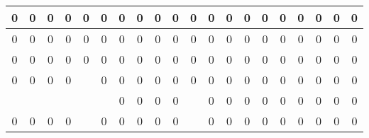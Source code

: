 \documentclass[a4paper]{article}
\begin{document}
{\begin{tabular}{|c|c|c|c|c|c|c|c|c|c|c|c|c|c|c|c|c|c|c|c|}
\cellcolor{black}0 & \cellcolor{black}0 & \cellcolor{black}0 & \cellcolor{black}0 & \cellcolor{black}0 & \cellcolor{black}0 & \cellcolor{black}0 & \cellcolor{black}0 & \cellcolor{black}0 & \cellcolor{black}0 & \cellcolor{black}0 & \cellcolor{black}0 & \cellcolor{black}0 & \cellcolor{black}0 & \cellcolor{black}0 & \cellcolor{black}0 & \cellcolor{black}0 & \cellcolor{black}0 & \cellcolor{black}0 & \cellcolor{black}0\\ \hline
\cellcolor{black}0 & \cellcolor{black}0 & \cellcolor{black}0 & \cellcolor{black}0 & \cellcolor{black}0 & \cellcolor{black}0 & \cellcolor{black}0 & \cellcolor{black}0 & \cellcolor{black}0 & \cellcolor{black}0 & \cellcolor{black}0 & \cellcolor{black}0 & \cellcolor{black}0 & \cellcolor{black}0 & \cellcolor{black}0 & \cellcolor{black}0 & \cellcolor{black}0 & \cellcolor{black}0 & \cellcolor{black}0 & \cellcolor{black}0\\ \hline
\cellcolor{black}0 & \cellcolor{black}0 & \cellcolor{black}0 & \cellcolor{black}0 & \cellcolor{black}0 & \cellcolor{black}0 & \cellcolor{black}0 & \cellcolor{black}0 & \cellcolor{black}0 & \cellcolor{black}0 & \cellcolor{black}0 & \cellcolor{black}0 & \cellcolor{black}0 & \cellcolor{black}0 & \cellcolor{black}0 & \cellcolor{black}0 & \cellcolor{black}0 & \cellcolor{black}0 & \cellcolor{black}0 & \cellcolor{black}0\\ \hline
\cellcolor{black}0 & \cellcolor{black}0 & \cellcolor{black}0 & \cellcolor{black}0 &  & \cellcolor{black}0 & \cellcolor{black}0 & \cellcolor{black}0 & \cellcolor{black}0 & \cellcolor{black}0 & \cellcolor{black}0 & \cellcolor{black}0 & \cellcolor{black}0 & \cellcolor{black}0 & \cellcolor{black}0 & \cellcolor{black}0 & \cellcolor{black}0 & \cellcolor{black}0 & \cellcolor{black}0 & \cellcolor{black}0\\ \hline
 &  &  &  &  &  & \cellcolor{black}0 & \cellcolor{black}0 & \cellcolor{black}0 & \cellcolor{black}0 &  & \cellcolor{black}0 & \cellcolor{black}0 & \cellcolor{black}0 & \cellcolor{black}0 & \cellcolor{black}0 & \cellcolor{black}0 & \cellcolor{black}0 & \cellcolor{black}0 & \cellcolor{black}0\\ \hline
\cellcolor{black}0 & \cellcolor{black}0 & \cellcolor{black}0 & \cellcolor{black}0 &  & \cellcolor{black}0 & \cellcolor{black}0 & \cellcolor{black}0 & \cellcolor{black}0 & \cellcolor{black}0 &  & \cellcolor{black}0 & \cellcolor{black}0 & \cellcolor{black}0 & \cellcolor{black}0 & \cellcolor{black}0 & \cellcolor{black}0 & \cellcolor{black}0 & \cellcolor{black}0 & \cellcolor{black}0\\ \hline

\end{tabular}}
\end{document}
